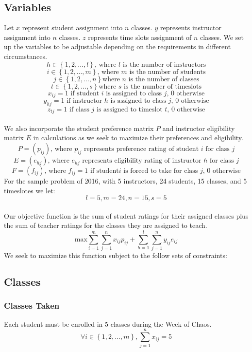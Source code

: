 \documentclass[11pt]{article}
\begin{document}
\subsection{Variables}
\indent Let $x$ represent student assignment into $n$ classes. $y$ represents instructor assignment into $n$ classes. $z$ represents time slots assignment of $n$ classes. We set up the variables to be adjustable depending on the requirements in different circumstances. 
\[h \in \left\{ {1,2,...,l}\right\}\text{, where 
}l \text{ is the number of instructors}\]
\[i \in \left\{ {1,2,...,m}\right\}\text{, where 
}m \text{ is the number of students}\]
\[j \in \left\{{1,2,...,n}\right\} \text{where } n \text{ is the number of classes} \]
\[t \in \left\{{1,2,...,s}\right\} \text{where } s \text{ is the number of timeslots} \]
\[x_{ij} = 1 \text{ if student } i \text{ is assigned to class }j \text{, 0 otherwise}\]
\[y_{hj} = 1 \text{ if instructor } h  \text{ is assigned to class }j \text{, 0 otherwise}\]
\[z_{tj} = 1 \text{ if class } j  \text{ is assigned to timeslot }t \text{, 0 otherwise}\]\\
We also incorporate the student preference matrix $P$ and instructor eligibility matrix $E$ in calculations as we seek to maximize their preferences and eligibility.
\[P =(p_{ij}) \text{, where } p_{ij} \text{ represents preference rating of student } i \text{ for class }j\]
\[E =(e_{hj}) \text{, where } e_{hj} \text{ represents eligibility rating of instructor } h \text{ for class }j\]
\[F =(f_{ij}) \text{, where } f_{ij} = 1 \text{ if student} i \text{ is forced to take for class }j \text{, 0 otherwise}\]
For the sample problem of 2016, with 5 instructors, 24 students, 15 classes, and 5 timeslotes we let:
\[l = 5, m = 24, n = 15, s = 5\]\\
\indent Our objective function is the sum of student ratings for their assigned classes plus the sum of teacher ratings for the classes they are assigned to teach.\\
\[\text{max} \sum_{i=1}^{m} \sum_{j=1}^{n}x_{ij}p_{ij} + \sum_{h=1}^{l}\sum_{j=1}^{n}y_{ij}e_{ij}\]
We seek to maximize this function subject to the follow sets of constraints:\\
\subsection{Classes}
\subsubsection{Classes Taken}
Each student must be enrolled in 5 classes during the Week of Chaos.
\[\forall i \in \left\{ {1,2,...,m}\right\},\sum_{j=1}^{n}x_{ij} = 5\]
\end{document}
